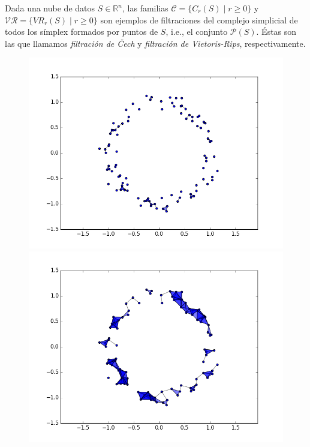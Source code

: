 \documentclass[12pt,a4paper,twoside]{article} %
\theoremstyle{plain}
\theoremstyle{definition}
\newcommand{\R}{\mathbb{R}}
\newcommand{\tq}{\; | \;}
\begin{document}
Dada una nube de datos $S\in \R^n$, las familias $\mathcal{C} = \{ C_r(S) \tq r \geq 0 \}$ y $\mathcal{VR} = \{ VR_r(S) \tq r \geq 0 \}$ son ejemplos de filtraciones del complejo simplicial de todos los símplex formados por puntos de $S$, i.e., el conjunto $\mathcal{P}(S)$. Éstas son las que llamamos \emph{filtración de Čech} y \emph{filtración de Vietoris-Rips}, respectivamente.

\begin{figure}[h!]
\centering
\includegraphics[scale=0.28]{img/figure_2.png}
\includegraphics[scale=0.28]{img/figure_3.png}

\end{figure}
\end{document}
